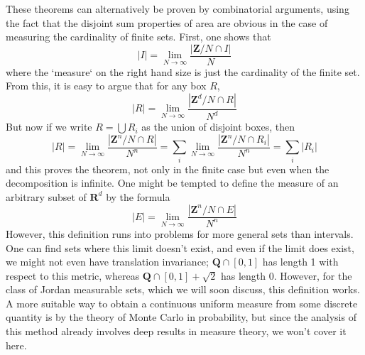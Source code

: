\begin{remark}
These theorems can alternatively be proven by combinatorial arguments, using the fact that the disjoint sum properties of area are obvious in the case of measuring the cardinality of finite sets. First, one shows that
%
\[ |I| = \lim_{N \to \infty} \frac{|\mathbf{Z}/N \cap I|}{N} \]
%
where the `measure` on the right hand size is just the cardinality of the finite set. From this, it is easy to argue that for any box $R$,
%
\[ |R| = \lim_{N \to \infty} \frac{|\mathbf{Z}^d/N \cap R|}{N^d} \]
%
But now if we write $R = \bigcup R_i$ as the union of disjoint boxes, then
%
\[ |R| = \lim_{N \to \infty} \frac{|\mathbf{Z}^n/N \cap R|}{N^n} = \sum_i \lim_{N \to \infty} \frac{|\mathbf{Z}^n/N \cap R_i|}{N^n} = \sum_i |R_i| \]
%
and this proves the theorem, not only in the finite case but even when the decomposition is infinite. One might be tempted to define the measure of an arbitrary subset of $\mathbf{R}^d$ by the formula
%
\[ |E| = \lim_{N \to \infty} \frac{|\mathbf{Z}^n/N \cap E|}{N^n} \]
%
However, this definition runs into problems for more general sets than intervals. One can find sets where this limit doesn't exist, and even if the limit does exist, we might not even have translation invariance; $\mathbf{Q} \cap [0,1]$ has length 1 with respect to this metric, whereas $\mathbf{Q} \cap [0,1] + \sqrt{2}$ has length 0. However, for the class of Jordan measurable sets, which we will soon discuss, this definition works. A more suitable way to obtain a continuous uniform measure from some discrete quantity is by the theory of Monte Carlo in probability, but since the analysis of this method already involves deep results in measure theory, we won't cover it here.
\end{remark}

%
%
%
%
%
%
%
%
%
%
%

